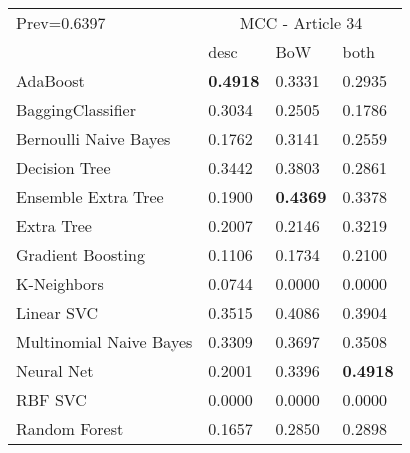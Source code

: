 \begin{tabular}{|l|l|l|l| }
\hline
Prev=0.6397 &  \multicolumn{3}{c|}{MCC - Article 34} \\
\cline{2-4} & desc & BoW & both \\ \hline
AdaBoost                & {\bf 0.4918} & 0.3331 & 0.2935\\
BaggingClassifier       & 0.3034 & 0.2505 & 0.1786\\
Bernoulli Naive Bayes   & 0.1762 & 0.3141 & 0.2559\\
Decision Tree           & 0.3442 & 0.3803 & 0.2861\\
Ensemble Extra Tree     & 0.1900 & {\bf 0.4369} & 0.3378\\
Extra Tree              & 0.2007 & 0.2146 & 0.3219\\
Gradient Boosting       & 0.1106 & 0.1734 & 0.2100\\
K-Neighbors             & 0.0744 & 0.0000 & 0.0000\\
Linear SVC              & 0.3515 & 0.4086 & 0.3904\\
Multinomial Naive Bayes & 0.3309 & 0.3697 & 0.3508\\
Neural Net              & 0.2001 & 0.3396 & {\bf 0.4918}\\
RBF SVC                 & 0.0000 & 0.0000 & 0.0000\\
Random Forest           & 0.1657 & 0.2850 & 0.2898\\
\hline
\end{tabular}